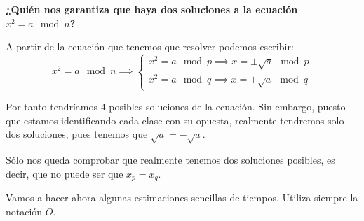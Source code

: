 \begin{problem}[8]
\textbf{¿Quién nos garantiza que haya dos soluciones a la ecuación $x^2=a \mod n$?}

A partir de la ecuación que tenemos que resolver podemos escribir:
\[x^2 = a \mod n \implies \left\{\begin{array}{l} x^2=a \mod p \implies x = \pm \sqrt{a} \mod p\\ x^2=a \mod q \implies x = \pm \sqrt{a} \mod q\end{array}\right. \]

Por tanto tendríamos 4 posibles soluciones de la ecuación. Sin embargo, puesto que estamos identificando cada clase con su opuesta, realmente tendremos solo dos soluciones, pues tenemos que $\sqrt{a} = -\sqrt{a}$.

Sólo nos queda comprobar que realmente tenemos dos soluciones posibles, es decir, que no puede ser que $x_p=x_q$.

\end{problem}

\vspace{0.2cm}

Vamos a hacer  ahora algunas estimaciones sencillas de tiempos. Utiliza siempre la
notación $O$.

\vspace{0.2cm}

